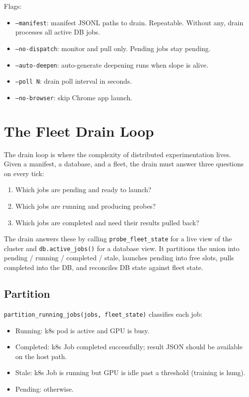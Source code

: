 \documentclass[11pt,openany]{book}
\theoremstyle{definition}
\theoremstyle{plain}
\begin{document}
Flags:
\begin{itemize}
  \item \texttt{--manifest}: manifest JSONL paths to drain. Repeatable.
    Without any, drain processes all active DB jobs.
  \item \texttt{--no-dispatch}: monitor and pull only. Pending jobs
    stay pending.
  \item \texttt{--auto-deepen}: auto-generate deepening runs when slope
    is alive.
  \item \texttt{--poll N}: drain poll interval in seconds.
  \item \texttt{--no-browser}: skip Chrome app launch.
\end{itemize}

\chapter{The Fleet Drain Loop}
\label{ch:drain}

The drain loop is where the complexity of distributed experimentation
lives. Given a manifest, a database, and a fleet, the drain must answer
three questions on every tick:
\begin{enumerate}
  \item Which jobs are pending and ready to launch?
  \item Which jobs are running and producing probes?
  \item Which jobs are completed and need their results pulled back?
\end{enumerate}

The drain answers these by calling \texttt{probe\_fleet\_state} for a
live view of the cluster and \texttt{db.active\_jobs()} for a database
view. It partitions the union into pending / running / completed / stale,
launches pending into free slots, pulls completed into the DB, and
reconciles DB state against fleet state.

\section{Partition}

\texttt{partition\_running\_jobs(jobs, fleet\_state)} classifies each
job:
\begin{itemize}
  \item Running: k8s pod is active and GPU is busy.
  \item Completed: k8s Job completed successfully; result JSON should
    be available on the host path.
  \item Stale: k8s Job is running but GPU is idle past a threshold
    (training is hung).
  \item Pending: otherwise.
\end{itemize}
\end{document}
